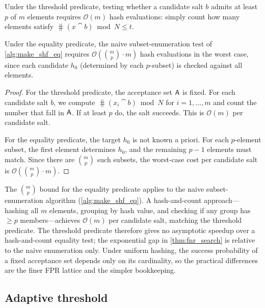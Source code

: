 \begin{theorem}
\label{thm:fnr_search}
Under the threshold predicate, testing whether a candidate salt $b$ admits at
least $p$ of $m$ elements requires $\mathcal{O}(m)$ hash evaluations: simply
count how many elements satisfy $\hash(x \cat b) \bmod N \leq t$.

Under the equality predicate, the naive subset-enumeration test of
\cref{alg:make_shf_eq} requires
$\mathcal{O}\!\left(\binom{m}{p} \cdot m\right)$ hash evaluations in the worst
case, since each candidate $h_0$ (determined by each $p$-subset) is
checked against all elements.
\end{theorem}
\begin{proof}
For the threshold predicate, the acceptance set $\Set{A}$ is fixed.
For each candidate salt $b$, we compute $\hash(x_i \cat b) \bmod N$ for
$i = 1,\ldots,m$ and count the number that fall in $\Set{A}$.
If at least $p$ do, the salt succeeds.
This is $\mathcal{O}(m)$ per candidate salt.

For the equality predicate, the target $h_0$ is not known a priori.
For each $p$-element subset, the first element determines $h_0$, and the
remaining $p-1$ elements must match.
Since there are $\binom{m}{p}$ such subsets, the worst-case cost per candidate
salt is $\mathcal{O}\!\left(\binom{m}{p} \cdot m\right)$.
\end{proof}

\begin{remark}
The $\binom{m}{p}$ bound for the equality predicate applies to the naive
subset-enumeration algorithm (\cref{alg:make_shf_eq}).
A hash-and-count approach---hashing all $m$ elements, grouping by hash value,
and checking if any group has $\geq p$ members---achieves $\mathcal{O}(m)$
per candidate salt, matching the threshold predicate.
The threshold predicate therefore gives no asymptotic speedup over a
hash-and-count equality test; the exponential gap in \cref{thm:fnr_search} is
relative to the naive enumeration only.
Under uniform hashing, the success probability of a fixed acceptance set
depends only on its cardinality, so the practical differences are the finer
FPR lattice and the simpler bookkeeping.
\end{remark}

\subsection{Adaptive threshold}
\label{sec:adaptive}

